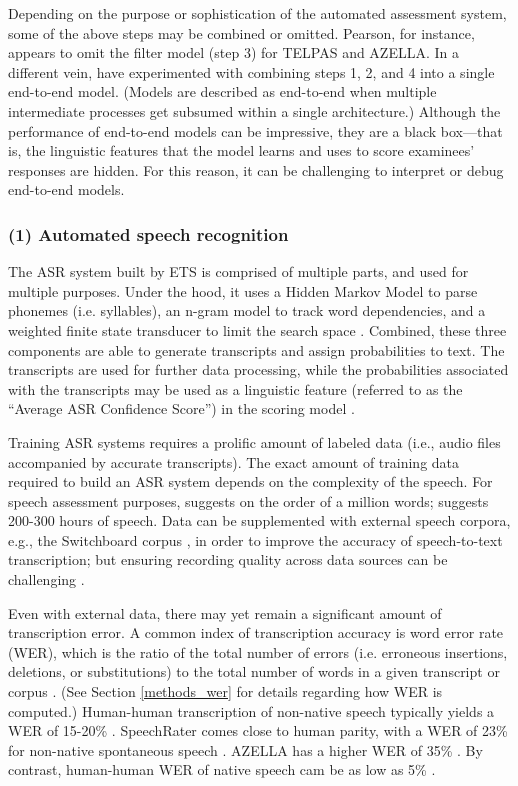 \documentclass [PhD] {uclathes}
\begin{document}
Depending on the purpose or sophistication of the automated assessment system, some of the above steps may be combined or omitted. Pearson, for instance, appears to omit the filter model (step 3) for TELPAS and AZELLA. In a different vein, \citet{chen2018end} have experimented with combining steps 1, 2, and 4 into a single end-to-end model. (Models are described as end-to-end when multiple intermediate processes get subsumed within a single architecture.) Although the performance of end-to-end models can be impressive, they are a black box—that is, the linguistic features that the model learns and uses to score examinees’ responses are hidden. For this reason, it can be challenging to interpret or debug end-to-end models.

\subsubsection{(1) Automated speech recognition}

The ASR system built by ETS is comprised of multiple parts, and used for multiple purposes. Under the hood, it uses a Hidden Markov Model to parse phonemes (i.e. syllables), an n-gram model to track word dependencies, and a weighted finite state transducer to limit the search space \citep{qian2019automatic}. Combined, these three components are able to generate transcripts and assign probabilities to text. The transcripts are used for further data processing, while the probabilities associated with the transcripts may be used as a linguistic feature (referred to as the “Average ASR Confidence Score”) in the scoring model \citep{zhang2019assessing}.

Training ASR systems requires a prolific amount of labeled data (i.e., audio files accompanied by accurate transcripts). The exact amount of training data required to build an ASR system depends on the complexity of the speech. For speech assessment purposes, \citet{qian2019automatic} suggests on the order of a million words; \citet{evanini2017approaches} suggests 200-300 hours of speech. Data can be supplemented with external speech corpora, e.g., the Switchboard corpus \citep{godfrey1997switchboard}, in order to improve the accuracy of speech-to-text transcription; but ensuring recording quality across data sources can be challenging \citep{qian2019automatic}.

Even with external data, there may yet remain a significant amount of transcription error. A common index of transcription accuracy is word error rate (WER), which is the ratio of the total number of errors (i.e. erroneous insertions, deletions, or substitutions) to the total number of words in a given transcript or corpus \citep{qian2019automatic}. (See Section \ref{methods_wer} for details regarding how WER is computed.) Human-human transcription of non-native speech typically yields a WER of 15-20\% \citep{zechner2009}. SpeechRater comes close to human parity, with a WER of 23\% for non-native spontaneous speech \citep{tao2016exploring}. AZELLA has a higher WER of 35\% \citep{cheng2014automatic}. By contrast, human-human WER of native speech cam be as low as 5\% \citep{xiong2016achieving}.
\end{document}

